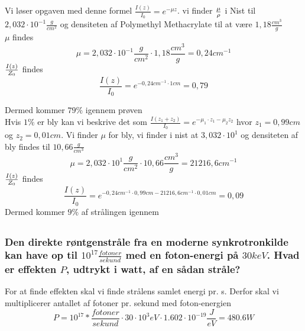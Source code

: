 \documentclass[a4paper,twoside]{article}
\begin{document}
\subsection{}
Vi løser opgaven med denne formel $\frac{I(z)}{I_0}=e^{-\mu z}$. vi finder $\mu\over\rho$ i Nist til $2,032\cdot 10^{-1} \frac{g}{cm^2}$ og densiteten af Polymethyl Methacrylate til at være $1,18\frac{cm^3}{g}$\\
$\mu$ findes
\begin{equation*}
    \mu=2,032\cdot10^{-1}\frac{g}{cm^2}\cdot1,18\frac{cm^3}{g}=0,24cm^{-1}
\end{equation*}
$I(z)\over Z_0$ findes
\begin{equation*}
    \frac{I(z)}{I_0}=e^{-0,24cm^{-1}\cdot 1cm}=0,79
\end{equation*}
 
    Dermed kommer $79\%$ igennem prøven\\
Hvis $1\%$ er bly kan vi beskrive det som $\frac{I(z_1+z_2)}{I_0}=e^{-\mu_1\cdot z_1-\mu_2 z_2}$ hvor $z_1=0,99cm$ og $z_2=0,01cm$. Vi finder $\mu$ for bly, vi finder i nist at $3,032\cdot10^1$ og densiteten af bly findes til $10,66\frac{g}{cm^3}$
\begin{equation*}
    \mu=2,032\cdot10^{1}\frac{g}{cm^2}\cdot10,66\frac{cm^3}{g}=21216,6cm^{-1}
\end{equation*}
$I(z)\over Z_0$ findes
\begin{equation*}
    \frac{I(z)}{I_0}=e^{-0,24cm^{-1}\cdot 0,99cm - 21216,6cm^{-1}\cdot 0,01cm}=0,09
\end{equation*}
Dermed kommer $9\%$ af strålingen igennem



\subsection{}
\subsubsection*{Den direkte røntgenstråle fra en moderne synkrotronkilde kan have op til $10^{17} \frac{fotoner}{sekund}$ med en foton-energi på $30keV$. Hvad er effekten $P$, udtrykt i watt, af en sådan stråle?}
For at finde effekten skal vi finde strålens samlet energi pr. s. Derfor skal vi multiplicerer antallet af fotoner pr. sekund med foton-energien 
\begin{equation*}
P=10^{17}*\frac{fotoner}{sekund}\cdot30\cdot10^{3}eV\cdot1.602\cdot10^{-19} \frac{J}{eV}=480.6W
\end{equation*}
    
\end{document}
